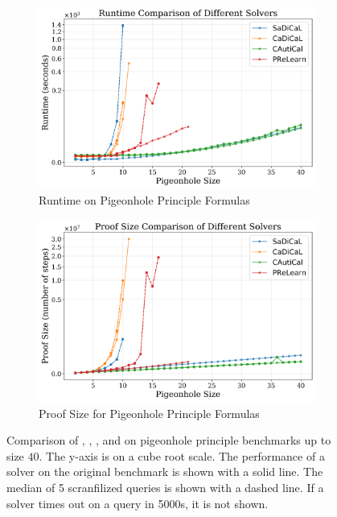 \begin{figure}[!t]
    \centering
    \begin{subfigure}[t]{0.4\textwidth}
        \centering
        \includegraphics[width=\textwidth]{figs/pigeonhole_runtime_comparison.png}
        \caption{Runtime on Pigeonhole Principle Formulas}
        \label{fig:pigeonhole-runtime-comparison}
    \end{subfigure}
    \hspace{0.06\textwidth}
    \begin{subfigure}[t]{0.4\textwidth}
        \centering
        \includegraphics[width=\textwidth]{figs/pigeonhole_proof_size_comparison.png}
        \caption{Proof Size for Pigeonhole Principle Formulas}
        \label{fig:pigeonhole-proof-size-comparison}
    \end{subfigure}
    \caption{Comparison of \tool, \cadical, \sadical, and \prelearn on pigeonhole principle benchmarks up to size $40$. The y-axis is on a cube root scale. The performance of a solver on the original benchmark is shown with a solid line. The median of 5 scranfilized queries is shown with a dashed line. If a solver times out on a query in 5000s, it is not shown.}
    \label{fig:pigeonhole-results}
\end{figure}

